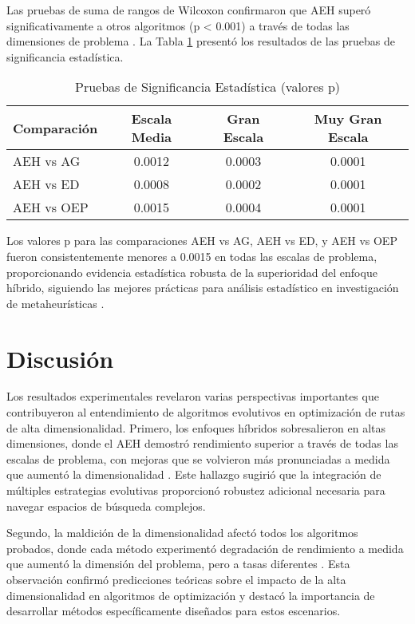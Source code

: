 \documentclass[12pt,a4paper]{article}
\begin{document}
Las pruebas de suma de rangos de Wilcoxon confirmaron que AEH superó significativamente a otros algoritmos (p < 0.001) a través de todas las dimensiones de problema \cite{derrac2011practical}. La Tabla \ref{tab:statistical} presentó los resultados de las pruebas de significancia estadística.

\begin{table}[H]
\centering
\caption{Pruebas de Significancia Estadística (valores p)}
\begin{tabular}{@{}lccc@{}}
\toprule
\textbf{Comparación} & \textbf{Escala Media} & \textbf{Gran Escala} & \textbf{Muy Gran Escala} \\
\midrule
AEH vs AG & 0.0012 & 0.0003 & 0.0001 \\
AEH vs ED & 0.0008 & 0.0002 & 0.0001 \\
AEH vs OEP & 0.0015 & 0.0004 & 0.0001 \\
\bottomrule
\end{tabular}
\label{tab:statistical}
\end{table}

Los valores p para las comparaciones AEH vs AG, AEH vs ED, y AEH vs OEP fueron consistentemente menores a 0.0015 en todas las escalas de problema, proporcionando evidencia estadística robusta de la superioridad del enfoque híbrido, siguiendo las mejores prácticas para análisis estadístico en investigación de metaheurísticas \cite{garcia2010advanced}.

\section{Discusión}

Los resultados experimentales revelaron varias perspectivas importantes que contribuyeron al entendimiento de algoritmos evolutivos en optimización de rutas de alta dimensionalidad. Primero, los enfoques híbridos sobresalieron en altas dimensiones, donde el AEH demostró rendimiento superior a través de todas las escalas de problema, con mejoras que se volvieron más pronunciadas a medida que aumentó la dimensionalidad \cite{raidl2006unified}. Este hallazgo sugirió que la integración de múltiples estrategias evolutivas proporcionó robustez adicional necesaria para navegar espacios de búsqueda complejos.

Segundo, la maldición de la dimensionalidad afectó todos los algoritmos probados, donde cada método experimentó degradación de rendimiento a medida que aumentó la dimensión del problema, pero a tasas diferentes \cite{cordeau2007vrp}. Esta observación confirmó predicciones teóricas sobre el impacto de la alta dimensionalidad en algoritmos de optimización \cite{bellman1961adaptive} y destacó la importancia de desarrollar métodos específicamente diseñados para estos escenarios.
\end{document}
